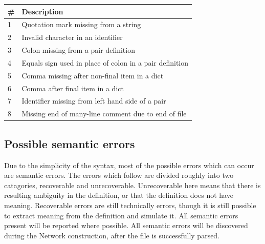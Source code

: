 \documentclass[a4paper]{article}
\begin{document}
		\begin{table}[h]
            \centering
            \begin{tabular}{p{0.5cm}p{8cm}}
                \toprule
                \#     & Description                                                              \\ \midrule
                1      & Quotation mark missing from a string                                     \\
				2      & Invalid character in an identifier                                       \\
				3      & Colon missing from a pair definition                                     \\
				4      & Equals sign used in place of colon in a pair definition                  \\
				5      & Comma missing after non-final item in a dict                             \\
				6      & Comma after final item in a dict                                         \\
				7      & Identifier missing from left hand side of a pair                         \\
				8      & Missing end of many-line comment due to end of file                      \\ \bottomrule
            \end{tabular}
        \end{table}

    \subsection{Possible semantic errors}
        Due to the simplicity of the syntax, most of the possible errors which can occur are semantic errors. The errors which follow are divided roughly into two catagories, recoverable and unrecoverable. Unrecoverable here means that there is resulting ambiguity in the definition, or that the definition does not have meaning. Recoverable errors are still technically errors, though it is still possible to extract meaning from the definition and simulate it. All semantic errors present will be reported where possible. All semantic errors will be discovered during the Network construction, after the file is successfully parsed.
\end{document}

